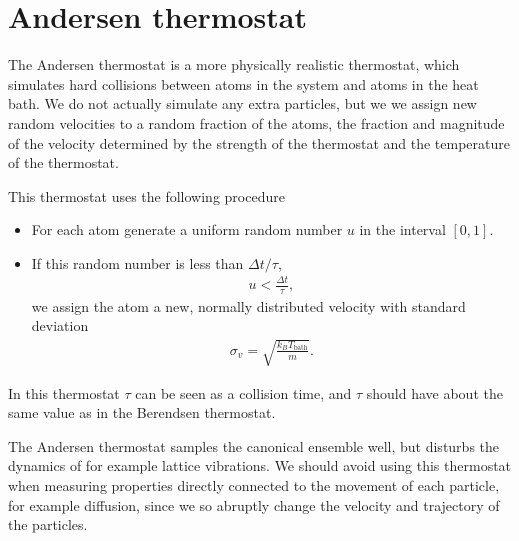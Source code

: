 \section{Andersen thermostat}
The Andersen thermostat is a more physically realistic thermostat, which simulates hard collisions between atoms in the system and atoms in the heat bath. We do not actually simulate any extra particles, but we we assign new random velocities to a random fraction of the atoms, the fraction and magnitude of the velocity determined by the strength of the thermostat and the temperature of the thermostat. 

This thermostat uses the following procedure%
%
\begin{itemize}
    \item For each atom generate a uniform random number $u$ in the interval $[0,1]$.
    \item If this random number is less than $\Delta t/\tau$,
        \begin{align*}
            u < \frac{\Delta t}{\tau},
        \end{align*}
        we assign the atom a new, normally distributed velocity with standard deviation
        \begin{align*}
            \sigma_v = \sqrt{\frac{k_B T_\text{bath}}{m}}.
        \end{align*}
\end{itemize}
%
In this thermostat $\tau$ can be seen as a collision time, and $\tau$ should have about the same value as in the Berendsen thermostat.

The Andersen thermostat samples the canonical ensemble well, but disturbs the dynamics of for example lattice vibrations. We should avoid using this thermostat when measuring properties directly connected to the movement of each particle, for example diffusion, since we so abruptly change the velocity and trajectory of the particles.